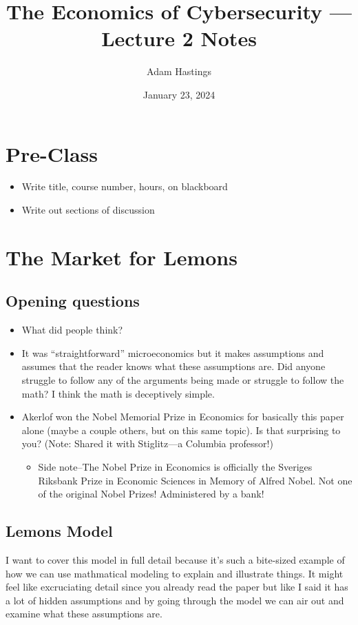 \documentclass[11pt]{article}
\title{The Economics of Cybersecurity --- Lecture 2 Notes}
\date{January 23, 2024}
\author{Adam Hastings}
\begin{document}
\maketitle

\section*{Pre-Class}
\begin{itemize}
    \item Write title, course number, hours, on blackboard
    \item Write out sections of discussion
\end{itemize}


\section{The Market for Lemons}

\subsection{Opening questions}
\begin{itemize}
    \item What did people think?
    \item It was ``straightforward'' microeconomics but it makes assumptions and assumes that the reader knows what these assumptions are. Did anyone struggle to follow any of the arguments being made or struggle to follow the math? I think the math is deceptively simple.
    \item Akerlof won the Nobel Memorial Prize in Economics for basically this paper alone (maybe a couple others, but on this same topic). Is that surprising to you? (Note: Shared it with Stiglitz---a Columbia professor!)
    \begin{itemize}
        \item Side note--The Nobel Prize in Economics is officially the Sveriges Riksbank Prize in Economic Sciences in Memory of Alfred Nobel. Not one of the original Nobel Prizes! Administered by a bank!
    \end{itemize}
\end{itemize}



\subsection{Lemons Model}

I want to cover this model in full detail because it's such a bite-sized example of how we can use mathmatical modeling to explain and illustrate things. It might feel like excruciating detail since you already read the paper but like I said it has a lot of hidden assumptions and by going through the model we can air out and examine what these assumptions are.
\end{document}
